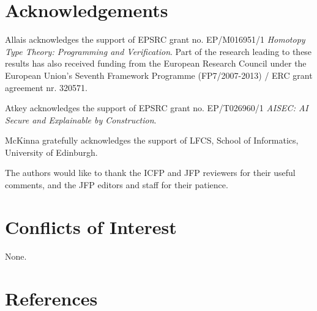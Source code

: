 \documentclass{jfp}
\begin{document}
\maketitle




\section*{Acknowledgements}

Allais acknowledges the support of EPSRC grant no. EP/M016951/1
\emph{Homotopy Type Theory: Programming and Verification}.
Part of the research leading to these results has also received funding from
the European Research Council under the European Union’s Seventh Framework
Programme (FP7/2007-2013) / ERC grant agreement nr. 320571.

Atkey acknowledges the support of EPSRC grant no. EP/T026960/1
\emph{AISEC: AI Secure and Explainable by Construction}.

McKinna gratefully acknowledges the support of LFCS, School of Informatics, University of Edinburgh.

The authors would like to thank the ICFP and JFP reviewers for their
useful comments, and the JFP editors and staff for their patience.

\section*{Conflicts of Interest}

None.


\renewcommand{\bibsection}{}
\section*{References}



\label{lastpage01}
\end{document}
